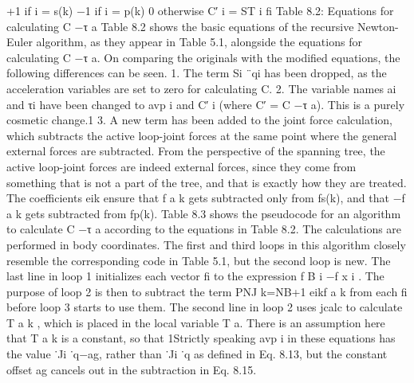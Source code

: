 +1 if i = s(k) −1 if i = p(k) 0 otherwise C′ i = ST i fi Table 8.2: Equations for calculating C −τ a Table 8.2 shows the basic equations of the recursive Newton-Euler algorithm, as they appear in Table 5.1, alongside the equations for calculating C −τ a. On comparing the originals with the modified equations, the following differences can be seen. 1. The term Si ¨qi has been dropped, as the acceleration variables are set to zero for calculating C. 2. The variable names ai and τi have been changed to avp i and C′ i (where C′ = C −τ a). This is a purely cosmetic change.1 3. A new term has been added to the joint force calculation, which subtracts the active loop-joint forces at the same point where the general external forces are subtracted. From the perspective of the spanning tree, the active loop-joint forces are indeed external forces, since they come from something that is not a part of the tree, and that is exactly how they are treated. The coefficients eik ensure that f a k gets subtracted only from fs(k), and that −f a k gets subtracted from fp(k). Table 8.3 shows the pseudocode for an algorithm to calculate C −τ a according to the equations in Table 8.2. The calculations are performed in body coordinates. The first and third loops in this algorithm closely resemble the corresponding code in Table 5.1, but the second loop is new. The last line in loop 1 initializes each vector fi to the expression f B i −f x i . The purpose of loop 2 is then to subtract the term PNJ k=NB+1 eikf a k from each fi before loop 3 starts to use them. The second line in loop 2 uses jcalc to calculate T a k , which is placed in the local variable T a. There is an assumption here that T a k is a constant, so that 1Strictly speaking avp i in these equations has the value ˙Ji ˙q−ag, rather than ˙Ji ˙q as defined in Eq. 8.13, but the constant offset ag cancels out in the subtraction in Eq. 8.15.

